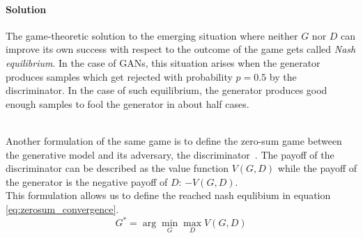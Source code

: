 \paragraph{Solution}
The game-theoretic solution to the emerging situation where neither $G$ nor $D$ can improve its own success with respect to the outcome of the game gets called \emph{Nash equilibrium}\cite{game_theory:1994}.
In the case of GANs, this situation arises when the generator produces samples which get rejected with probability $p=0.5$ by the discriminator. In the case of such equilibrium, the generator produces good enough samples to fool the generator in about half cases.\\\\



Another formulation of the same game is to define the zero-sum game between the generative model and its adversary, the discriminator~\cite[Chapter~20.10.4]{deeplearning:2016}.
The payoff of the discriminator can be described as the value function $V(G,D)$ while the payoff of the generator is the negative payoff of $D$: $-V(G,D)$.\\
This formulation allows us to define the reached nash equlibium in equation \ref{eq:zerosum_convergence}.
\begin{equation}
  \label{eq:zerosum_convergence}
  G^* = \arg \min_{G} \max_{D} V(G,D)
\end{equation}









